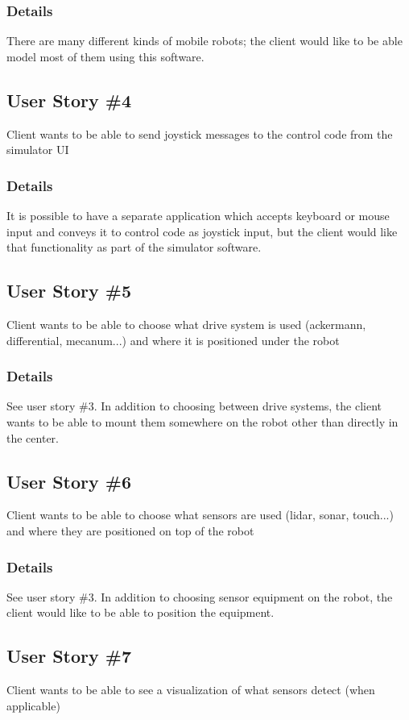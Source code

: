 \subsubsection{Details}
There are many different kinds of mobile robots; the client would like to be able model most of them using this software.

\subsection{User Story \#4} 
Client wants to be able to send joystick messages to the control code from the simulator UI

\subsubsection{Details}
It is possible to have a separate application which accepts keyboard or mouse input and conveys it to control code as joystick input, but the client would like that functionality as part of the simulator software.

\subsection{User Story \#5}
Client wants to be able to choose what drive system is used (ackermann, differential, mecanum...) and where it is positioned under the robot

\subsubsection{Details}
See user story \#3. In addition to choosing between drive systems, the client wants to be able to mount them somewhere on the robot other than directly in the center.

\subsection{User Story \#6} 
Client wants to be able to choose what sensors are used (lidar, sonar, touch...) and where they are positioned on top of the robot

\subsubsection{Details}
See user story \#3. In addition to choosing sensor equipment on the robot, the client would like to be able to position the equipment.

\subsection{User Story \#7} 
Client wants to be able to see a visualization of what sensors detect (when applicable)

